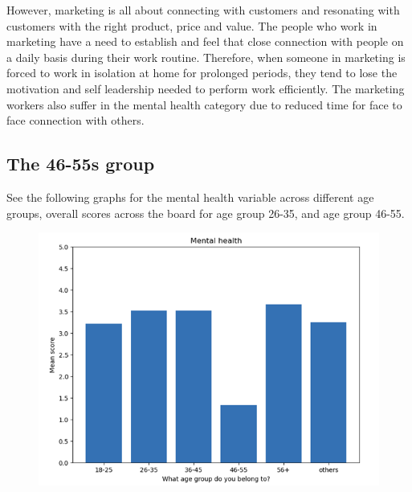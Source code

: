 \documentclass[12pt]{article}
\begin{document}
However, marketing is all about connecting with customers and resonating with customers with the right product, price and value. The people who work in marketing have a need to establish and feel that close connection with people on a daily basis during their work routine. Therefore, when someone in marketing is forced to work in isolation at home for prolonged periods, they tend to lose the motivation and self leadership needed to perform work efficiently. The marketing workers also suffer in the mental health category due to reduced time for face to face connection with others. 

\subsection*{The 46-55s group}

See the following graphs for the mental health variable across different age groups, overall scores across the board for age group 26-35, and age group 46-55.

\begin{figure}[h]
    \centering
    \includegraphics[scale=1]{mental.png}
    \label{mental}
\end{figure} \\
\end{document}
